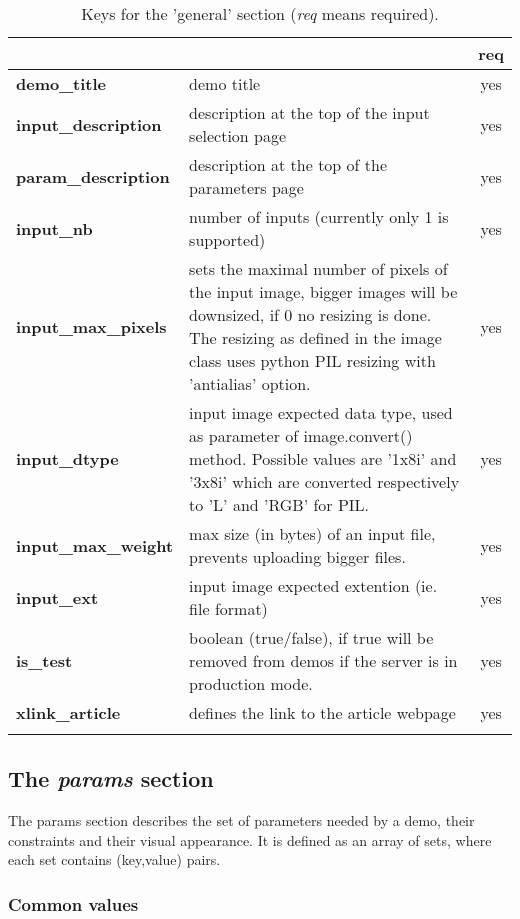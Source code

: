 \begin{longtable}{|>{\bf}L{\linewidth}|L{\linewidth}|c|}
\hline
      &  & {\bf req} 
\tabularnewline \hline \hline
 demo\_title         & demo title & yes\\ \hline
 input\_description  & description at the top of the input selection page 
                     & yes \\ \hline
 param\_description  & description at the top of the parameters page & yes
                      \\ \hline
 input\_nb           & number of inputs (currently only 1 is supported) & yes\\ 
\hline
 input\_max\_pixels & sets the maximal number of pixels of the input image, 
bigger images will be downsized, if 0 no resizing is done. The resizing as 
defined in the image class uses python PIL resizing with 'antialias' option. & 
yes  \\ \hline
 input\_dtype       & input image expected data type, used as parameter of 
image.convert() method. Possible values are '1x8i' and '3x8i' which are 
converted respectively to 'L' and 'RGB' for PIL.& yes  \\ \hline
 input\_max\_weight & max size (in bytes) of an input file, prevents uploading 
bigger files. & yes  \\ \hline
 input\_ext         & input image expected extention (ie. file format) & yes  
\\ \hline
 is\_test           & boolean (true/false), if true will be removed from demos 
if the server is in production mode.& yes  \\ \hline
 xlink\_article     & defines the link to the article webpage & yes  \\ \hline
\caption{Keys for the 'general' section ({\em req} means required).}
\end{longtable}

\subsection{The \emph{params} section}
The params section describes the set of parameters needed by a demo, their 
constraints and their visual appearance. It is defined as an array of sets, 
where each set contains (key,value) pairs.

\subsubsection{Common values}


